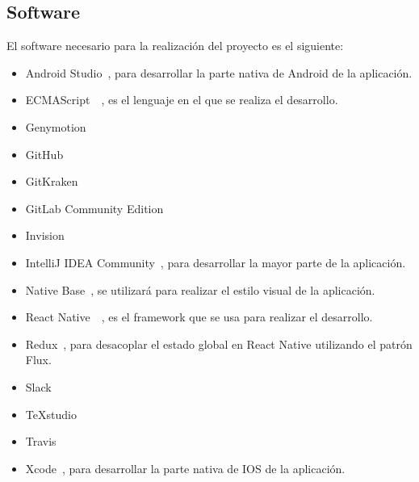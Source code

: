 \subsection{Software}

 El software necesario para la realización del proyecto es el siguiente:
\begin{itemize}
	\item Android Studio~\cite{ASTUDIO}, para desarrollar la parte nativa de Android de la aplicación.
	\item ECMAScript~\cite{ECMA}~\cite{ECMABOOK}, es el lenguaje en el que se realiza el desarrollo.
	\item Genymotion
	\item GitHub
	\item GitKraken
	\item GitLab Community Edition
	\item Invision
	\item IntelliJ IDEA Community~\cite{IDEA}, para desarrollar la mayor parte de la aplicación.
	\item Native Base~\cite{NABA}, se utilizará para realizar el estilo visual de la aplicación.
	\item React Native~\cite{RENA}~\cite{REACTBOOK}, es el framework que se usa para realizar el desarrollo.
	\item Redux~\cite{REDUX}, para desacoplar el estado global en React Native utilizando el patrón Flux.
	\item Slack
	\item TeXstudio
	\item Travis
	\item Xcode~\cite{XCODE}, para desarrollar la parte nativa de IOS de la aplicación.
\end{itemize}

